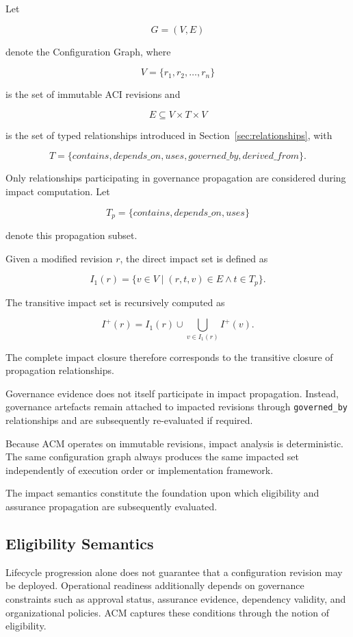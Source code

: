 \documentclass[10pt]{article}
\begin{document}
Let

\[
G=(V,E)
\]

denote the Configuration Graph, where

\[
V=\{r_1,r_2,\ldots,r_n\}
\]

is the set of immutable ACI revisions and

\[
E\subseteq V\times T\times V
\]

is the set of typed relationships introduced in Section~\ref{sec:relationships}, with

\[
T=
\{
contains,
depends\_on,
uses,
governed\_by,
derived\_from
\}.
\]

Only relationships participating in governance propagation are considered during impact computation. Let

\[
T_p=
\{
contains,
depends\_on,
uses
\}
\]

denote this propagation subset.

Given a modified revision \(r\), the direct impact set is defined as

\[
I_1(r)
=
\{
v\in V
\mid
(r,t,v)\in E
\land
t\in T_p
\}.
\]

The transitive impact set is recursively computed as

\[
I^{+}(r)
=
I_1(r)
\cup
\bigcup_{v\in I_1(r)} I^{+}(v).
\]

The complete impact closure therefore corresponds to the transitive closure of propagation relationships.

Governance evidence does not itself participate in impact propagation. Instead, governance artefacts remain attached to impacted revisions through \texttt{governed\_by} relationships and are subsequently re-evaluated if required.

Because ACM operates on immutable revisions, impact analysis is deterministic. The same configuration graph always produces the same impacted set independently of execution order or implementation framework.

The impact semantics constitute the foundation upon which eligibility and assurance propagation are subsequently evaluated.

\subsection{Eligibility Semantics}
\label{sec:eligibility}

Lifecycle progression alone does not guarantee that a configuration revision may be deployed. Operational readiness additionally depends on governance constraints such as approval status, assurance evidence, dependency validity, and organizational policies. ACM captures these conditions through the notion of eligibility.
\end{document}
